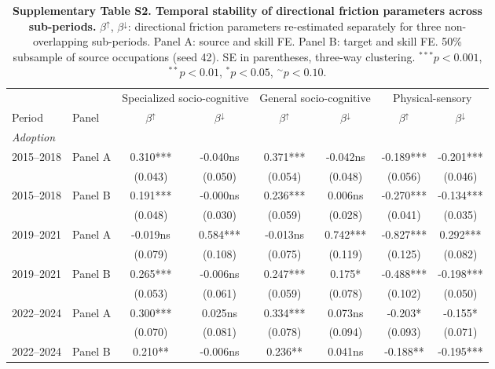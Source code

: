 \begin{table}[ht]
\centering\small
\caption{\textbf{Supplementary Table S2. Temporal stability of directional
  friction parameters across sub-periods.}
  $\beta^{\uparrow}$, $\beta^{\downarrow}$: directional friction parameters
  re-estimated separately for three non-overlapping sub-periods.
  Panel A: source and skill FE. Panel B: target and skill FE.
  50\% subsample of source occupations (seed 42).
  SE in parentheses, three-way clustering.
  $^{***}p<0.001$, $^{**}p<0.01$, $^{*}p<0.05$, $^{\sim}p<0.10$.}
\label{tab:SI_S2}
\begin{tabular}{llcccccc}
\toprule
 & & \multicolumn{2}{c}{Specialized socio-cognitive} & \multicolumn{2}{c}{General socio-cognitive} & \multicolumn{2}{c}{Physical-sensory} \\
\cmidrule(lr){3-4}\cmidrule(lr){5-6}\cmidrule(lr){7-8}
Period & Panel & $\beta^{\uparrow}$ & $\beta^{\downarrow}$ & $\beta^{\uparrow}$ & $\beta^{\downarrow}$ & $\beta^{\uparrow}$ & $\beta^{\downarrow}$ \\
\midrule
\multicolumn{8}{l}{\textit{Adoption}} \\
\multirow{2}{*}{2015–2018} & Panel A & 0.310*** & -0.040ns & 0.371*** & -0.042ns & -0.189*** & -0.201*** \\
 & & (0.043) & (0.050) & (0.054) & (0.048) & (0.056) & (0.046) \\
\multirow{2}{*}{2015–2018} & Panel B & 0.191*** & -0.000ns & 0.236*** & 0.006ns & -0.270*** & -0.134*** \\
 & & (0.048) & (0.030) & (0.059) & (0.028) & (0.041) & (0.035) \\
\multirow{2}{*}{2019–2021} & Panel A & -0.019ns & 0.584*** & -0.013ns & 0.742*** & -0.827*** & 0.292*** \\
 & & (0.079) & (0.108) & (0.075) & (0.119) & (0.125) & (0.082) \\
\multirow{2}{*}{2019–2021} & Panel B & 0.265*** & -0.006ns & 0.247*** & 0.175* & -0.488*** & -0.198*** \\
 & & (0.053) & (0.061) & (0.059) & (0.078) & (0.102) & (0.050) \\
\multirow{2}{*}{2022–2024} & Panel A & 0.300*** & 0.025ns & 0.334*** & 0.073ns & -0.203* & -0.155* \\
 & & (0.070) & (0.081) & (0.078) & (0.094) & (0.093) & (0.071) \\
\multirow{2}{*}{2022–2024} & Panel B & 0.210** & -0.006ns & 0.236** & 0.041ns & -0.188** & -0.195*** \\

\end{tabular}
\end{table}
